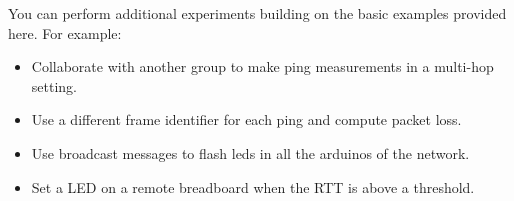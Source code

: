 You can perform additional experiments  building on the basic examples provided here.
For example:
\begin{itemize}
\item Collaborate with another group to make ping measurements in a multi-hop setting.
\item Use a different frame identifier for each ping and compute packet loss.
\item Use broadcast messages to flash leds in all the arduinos of the network.
\item Set a LED on a remote breadboard when the RTT is above a threshold.
\end{itemize}
